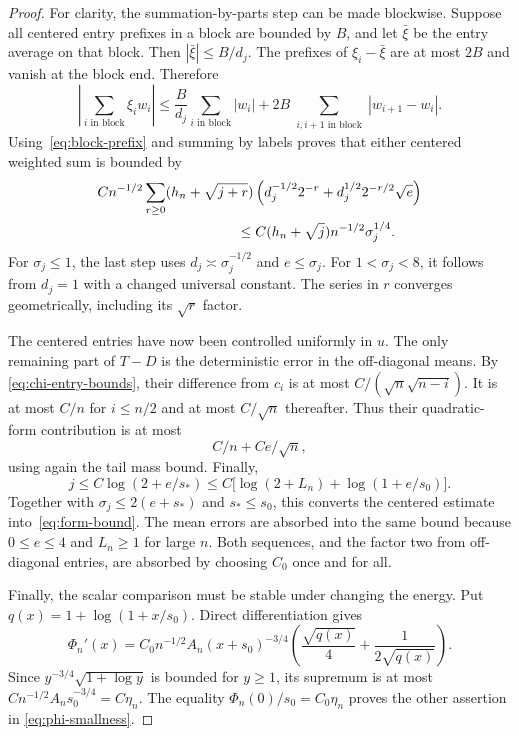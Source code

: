 \begin{proof}
For clarity, the summation-by-parts step can be made blockwise.  Suppose
all centered entry prefixes in a block are bounded by $B$, and let
$\bar\xi$ be the entry average on that block.  Then
$|\bar\xi|\le B/d_j$.  The prefixes of $\xi_i-\bar\xi$ are at most
$2B$ and vanish at the block end.  Therefore
\[
 \left|\sum_{i\text{ in block}}\xi_iw_i\right|
 \le\frac B{d_j}\sum_{i\text{ in block}}|w_i|
      +2B\sum_{\substack{i,i+1\text{ in block}}}|w_{i+1}-w_i|.
\]
Using~\eqref{eq:block-prefix} and summing by labels proves that either
centered weighted sum is bounded by
\begin{align*}
 &C n^{-1/2}\sum_{r\ge0}(h_n+\sqrt{j+r})
 \left(d_j^{-1/2}2^{-r}+d_j^{1/2}2^{-r/2}\sqrt e\right)\\
 &\hspace{35mm}\le C(h_n+\sqrt j)n^{-1/2}\sigma_j^{1/4}.
\end{align*}
For $\sigma_j\le1$, the last step uses
$d_j\asymp\sigma_j^{-1/2}$ and $e\le\sigma_j$.  For
$1<\sigma_j<8$, it follows from $d_j=1$ with a changed universal
constant.  The series in $r$ converges geometrically, including its
$\sqrt r$ factor.

The centered entries have now been controlled uniformly in $u$.
The only remaining part of $T-D$ is the deterministic error in the
off-diagonal means. By
\eqref{eq:chi-entry-bounds}, their difference from $c_i$ is at most
$C/(\sqrt n\sqrt{n-i})$.  It is at most $C/n$ for $i\le n/2$ and at
most $C/\sqrt n$ thereafter.  Thus their quadratic-form contribution is
at most
\[
 C/n+Ce/\sqrt n,
\]
using again the tail mass bound.  Finally,
\[
 j\le C\log(2+e/s_*)
 \le C\bigl[\log(2+L_n)+\log(1+e/s_0)\bigr].
\]
Together with $\sigma_j\le2(e+s_*)$ and $s_*\le s_0$, this converts
the centered estimate into~\eqref{eq:form-bound}.  The mean errors are
absorbed into the same bound because $0\le e\le4$ and $L_n\ge1$ for
large $n$.  Both sequences, and the factor two from off-diagonal entries,
are absorbed by choosing $C_0$ once and for all.

Finally, the scalar comparison must be stable under changing the
energy. Put $q(x)=1+\log(1+x/s_0)$. Direct differentiation gives
\[
 \Phi_n'(x)=C_0n^{-1/2}A_n(x+s_0)^{-3/4}
 \left(\frac{\sqrt{q(x)}}4+\frac1{2\sqrt{q(x)}}\right).
\]
Since $y^{-3/4}\sqrt{1+\log y}$ is bounded for $y\ge1$, its supremum
is at most $Cn^{-1/2}A_ns_0^{-3/4}=C\eta_n$.
The equality $\Phi_n(0)/s_0=C_0\eta_n$ proves the other assertion in
\eqref{eq:phi-smallness}.
\end{proof}


